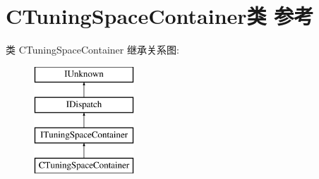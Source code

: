 \hypertarget{class_c_tuning_space_container}{}\section{C\+Tuning\+Space\+Container类 参考}
\label{class_c_tuning_space_container}
类 C\+Tuning\+Space\+Container 继承关系图\+:\begin{figure}[H]
\begin{center}
\leavevmode
\includegraphics[height=4.000000cm]{class_c_tuning_space_container}
\end{center}
\end{figure}
